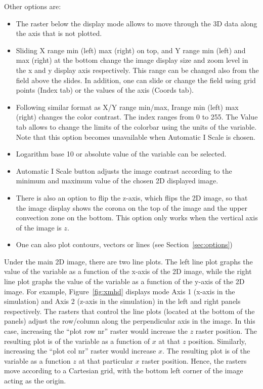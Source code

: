 \documentclass[12pt,preprint]{aastex}
\begin{document}
Other options are:
\begin{itemize}
\item The raster below the display mode allows to move through the 3D data along the axis 
that is not plotted. 
\item Sliding X range min (left) max (right) on top, and Y range min (left) and max (right) at the 
bottom change the image display size and zoom level in the x and y display axis respectively. This 
range can be changed also from the field above the slides. In addition, one can slide or change 
the field using grid points (Index tab) or the values of the axis (Coords tab).  
\item Following similar format as X/Y range min/max, Irange min (left) max (right) changes 
the color contrast. The index ranges from 0 to 255. The Value tab allows to change the limits 
of the colorbar using the units of the variable. Note that this option becomes unavailable when 
Automatic I Scale is chosen. 
\item Logarithm base 10 or absolute value of the variable can be selected.
\item Automatic I Scale button adjusts the image contrast according to the minimum and maximum 
value of the chosen 2D displayed image. 
\item There is also an option to flip the z-axis, which flips the 2D image, so that the image display 
shows the corona on the top of the image and the upper convection zone on the bottom. 
This option only works when the vertical axis of the image is $z$.
\item One can also plot contours, vectors or lines (see Section~\ref{sec:options})
\end{itemize}

Under the main 2D image, there are two line plots. The left line plot graphs 
the value of the variable as a function of the x-axis of the 2D image, while the right 
line plot graphs the value of the variable as a function of the y-axis of the 2D 
image. For example, Figure~\ref{fig:xmhd} displays mode Axis 1 (x-axis in the 
simulation) and Axis 2 (z-axis in the simulation) in the left and right panels respectively. 
The rasters that control the line plots (located at the bottom of the panels) adjust the 
row/column along the perpendicular 
axis in the image. In this case, increasing the ``plot row nr'' raster would increase the $z$ raster 
position. The resulting plot is of the variable as a function of $x$ at that $z$ position. 
Similarly, increasing the ``plot col nr'' raster would increase $x$. 
The resulting plot is of the variable as a function $z$ at that particular $x$ raster position. 
Hence, the rasters move according to a Cartesian grid, with the bottom left corner of the image 
acting as the origin.
\end{document}
